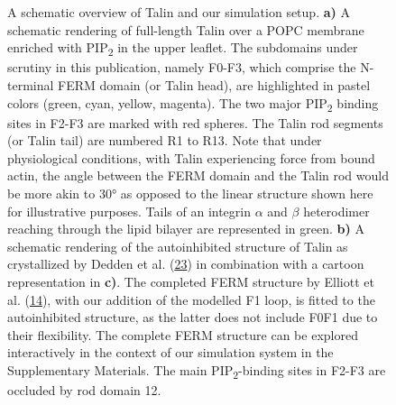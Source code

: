 \documentclass[
  twocolumn]{biophys-new-mod}
\begin{document}
\begin{figure}
\begin{minipage}[t]{0.50\linewidth}
{\centering 


}

\subcaption{\label{fig-tln-align-autoinhib}~}
\end{minipage}%

\caption{\label{fig-structure}A schematic overview of Talin and our
simulation setup. \textbf{a)} A schematic rendering of full-length Talin
over a POPC membrane enriched with PIP\textsubscript{2} in the upper
leaflet. The subdomains under scrutiny in this publication, namely
F0-F3, which comprise the N-terminal FERM domain (or Talin head), are
highlighted in pastel colors (green, cyan, yellow, magenta). The two
major PIP\textsubscript{2} binding sites in F2-F3 are marked with red
spheres. The Talin rod segments (or Talin tail) are numbered R1 to R13.
Note that under physiological conditions, with Talin experiencing force
from bound actin, the angle between the FERM domain and the Talin rod
would be more akin to 30° as opposed to the linear structure shown here
for illustrative purposes. Tails of an integrin \(\alpha\) and \(\beta\)
heterodimer reaching through the lipid bilayer are represented in green.
\textbf{b)} A schematic rendering of the autoinhibited structure of
Talin as crystallized by Dedden et al.
(\protect\hyperlink{ref-deddenArchitectureTalin1Reveals2019a}{23}) in
combination with a cartoon representation in \textbf{c)}. The completed
FERM structure by Elliott et al.
(\protect\hyperlink{ref-elliottStructureTalinHead2010}{14}), with our
addition of the modelled F1 loop, is fitted to the autoinhibited
structure, as the latter does not include F0F1 due to their flexibility.
The complete FERM structure can be explored interactively in the context
of our simulation system in the Supplementary Materials. The main
PIP\textsubscript{2}-binding sites in F2-F3 are occluded by rod domain
12.}

\end{figure}
\end{document}
